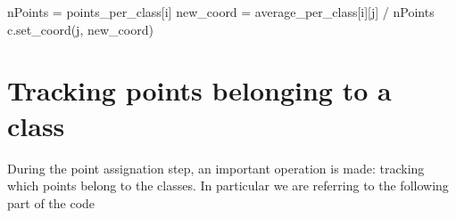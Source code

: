 \documentclass{report}
\begin{document}
\begin{minipage}[b]{0.48\textwidth}
\begin{algorithm}[H]
\begin{algorithmic}
                \State nPoints = points\_per\_class[i]
                    \State new\_coord = average\_per\_class[i][j] / nPoints
                    \State c.set\_coord(j, new\_coord)
                \EndFor
            \EndFor
        \EndFor
        \end{algorithmic}
    \end{algorithm}

    \section*{Tracking points belonging to a class}
    During the point assignation step, an important operation is made: tracking which points belong to the classes. In particular we are referring to the following part of the code 
\end{minipage}
\hspace{0.1in}
\end{document}
